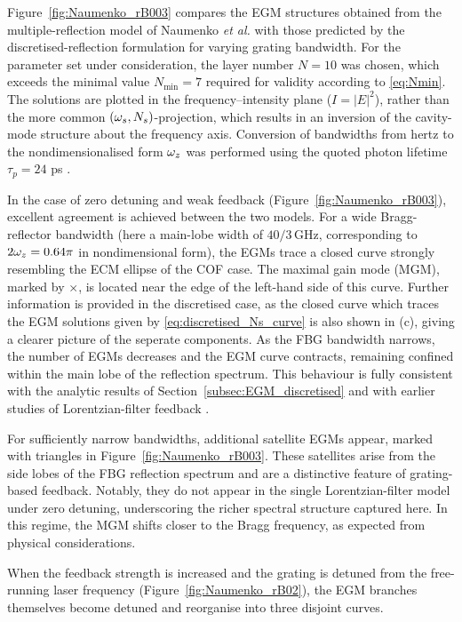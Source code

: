 %
\par
%
Figure~\ref{fig:Naumenko_rB003} compares the EGM structures obtained from the multiple-reflection model of Naumenko \textit{et al.} \cite{naumenko2003characteristics} with those predicted by the discretised-reflection formulation for varying grating bandwidth.
For the parameter set under consideration, the layer number $N=10$ was chosen, which exceeds the minimal value $N_\text{min}=7$ required for validity according to \eqref{eq:Nmin}.
The solutions are plotted in the frequency–intensity plane ($I=|E|^2$), rather than the more common $(\omega_s,N_s)$-projection, which results in an inversion of the cavity-mode structure about the frequency axis.
Conversion of bandwidths from hertz to the nondimensionalised form $\omega_z$ was performed using the quoted photon lifetime $\tau_p=24$ ps \cite{naumenko2003characteristics}.
%
\par
%
In the case of zero detuning and weak feedback (Figure~\ref{fig:Naumenko_rB003}), excellent agreement is achieved between the two models.
For a wide Bragg-reflector bandwidth (here a main-lobe width of $40/3\,$GHz, corresponding to $2\omega_z=0.64\pi$ in nondimensional form), the EGMs trace a closed curve strongly resembling the ECM ellipse of the COF case.
The maximal gain mode (MGM), marked by $\times$, is located near the edge of the left-hand side of this curve.
Further information is provided in the discretised case, as the closed curve which traces the EGM solutions given by \eqref{eq:discretised_Ns_curve} is also shown in (c), giving a clearer picture of the seperate components.
As the FBG bandwidth narrows, the number of EGMs decreases and the EGM curve contracts, remaining confined within the main lobe of the reflection spectrum.
This behaviour is fully consistent with the analytic results of Section~\ref{subsec:EGM_discretised} and with earlier studies of Lorentzian-filter feedback \cite{yousefi1999dynamical}.
%
\par
%
For sufficiently narrow bandwidths, additional satellite EGMs appear, marked with triangles in Figure~\ref{fig:Naumenko_rB003}.
These satellites arise from the side lobes of the FBG reflection spectrum and are a distinctive feature of grating-based feedback.
Notably, they do not appear in the single Lorentzian-filter model under zero detuning, underscoring the richer spectral structure captured here.
In this regime, the MGM shifts closer to the Bragg frequency, as expected from physical considerations.
%
\par
%
When the feedback strength is increased and the grating is detuned from the free-running laser frequency (Figure~\ref{fig:Naumenko_rB02}), the EGM branches themselves become detuned and reorganise into three disjoint curves.
